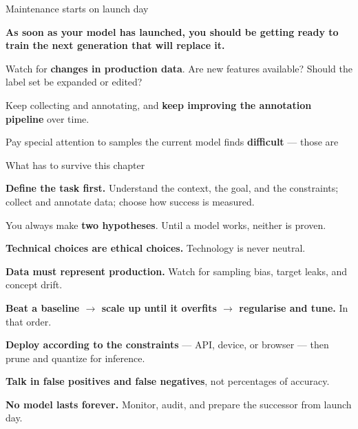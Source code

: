 \documentclass[aspectratio=169,11pt,t]{beamer}
\begin{document}
\begin{frame}[shrink=25]{Maintenance starts on launch day}
\begin{iband}[amber]
\textbf{As soon as your model has launched, you should be getting ready to train the next generation that will replace it.}
\end{iband}
\begin{ibullets}
\item Watch for \textbf{changes in production data}. Are new features available? Should the label set be expanded or edited?
\item Keep collecting and annotating, and \textbf{keep improving the annotation pipeline} over time.
\item Pay special attention to samples the current model finds \textbf{difficult} --- those are 
\end{ibullets}
\end{frame}

\begin{frame}[shrink=25]{What has to survive this chapter}
\begin{isteps}
\item \textbf{Define the task first.} Understand the context, the goal, and the constraints; collect and annotate data; choose how success is measured.
\item You always make \textbf{two hypotheses}. Until a model works, neither is proven.
\item \textbf{Technical choices are ethical choices.} Technology is never neutral.
\item \textbf{Data must represent production.} Watch for sampling bias, target leaks, and concept drift.
\item \textbf{Beat a baseline $\rightarrow$ scale up until it overfits $\rightarrow$ regularise and tune.} In that order.
\item \textbf{Deploy according to the constraints} --- API, device, or browser --- then prune and quantize for inference.
\item \textbf{Talk in false positives and false negatives}, not percentages of accuracy.
\item \textbf{No model lasts forever.} Monitor, audit, and prepare the successor from launch day.
\end{isteps}
\vskip 4pt
\vskip 2pt
\end{frame}
\end{document}
